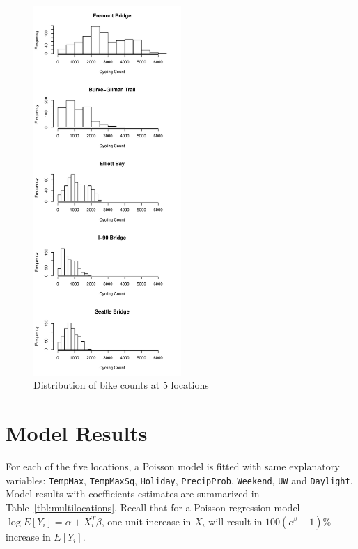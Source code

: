 \documentclass [11pt, proquest] {uwthesis}[2015/03/03]
\begin{document}
\begin{figure}
\centering
  \includegraphics[width=0.5\textwidth]{figures/5sites/distribution5} \caption{Distribution of bike counts at 5 locations }
 \label{fig:distribution5}
\end{figure}



\section{Model Results}
For each of the five locations, a Poisson model is fitted with same explanatory variables:
\texttt{TempMax}, \texttt{TempMaxSq}, \texttt{Holiday}, \texttt{PrecipProb}, \texttt{Weekend}, \texttt{UW} and \texttt{Daylight}. Model results with coefficients estimates are summarized in Table~\ref{tbl:multilocations}. Recall that for a Poisson regression model $\log{E[Y_i]} = \alpha + X_i^T \beta$, one unit increase in $X_i$ will result in $100(e^{\beta}-1)\%$ increase in $E[Y_i]$.
\end{document}
